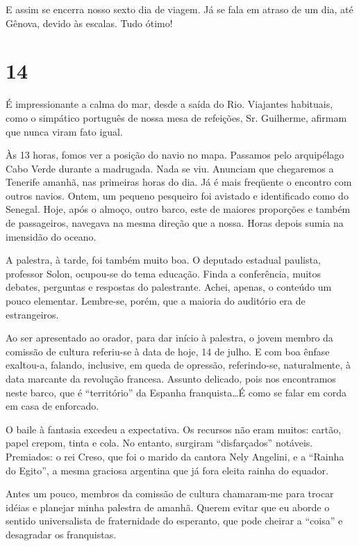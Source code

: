 E assim se encerra nosso sexto dia de viagem. Já se fala em atraso de um dia, até Gênova, devido às escalas. Tudo ótimo!


\section*{14 \adfflatleafright {}}

É impressionante a calma do mar, desde a saída do Rio. Viajantes habituais, como o simpático português de nossa mesa de refeições, Sr. Guilherme, afirmam que nunca viram fato igual.

Às 13 horas, fomos ver a posição do navio no mapa. Passamos pelo arquipélago Cabo Verde durante a madrugada. Nada se viu. Anunciam que chegaremos a Tenerife amanhã, nas primeiras horas do dia. Já é mais freqüente o encontro com outros navios. Ontem, um pequeno pesqueiro foi avistado e identificado como do Senegal. Hoje, após o almoço, outro barco, este de maiores proporções e também de passageiros, navegava na mesma direção que a nossa. Horas depois sumia na imensidão do oceano.

A palestra, à tarde, foi também muito boa. O deputado estadual paulista, professor Solon, ocupou-se do tema educação. Finda a conferência, muitos debates, perguntas e respostas do palestrante. Achei, apenas, o conteúdo um pouco elementar. Lembre-se, porém, que a maioria do auditório era de estrangeiros.

Ao ser apresentado ao orador, para dar início à palestra, o jovem membro da comissão de cultura referiu-se à data de hoje, 14 de julho. E com boa ênfase exaltou-a, falando, inclusive, em queda de opressão, referindo-se, naturalmente, à data marcante da revolução francesa. Assunto delicado, pois nos encontramos neste barco, que é ``território'' da Espanha franquista\ldots É como se falar em corda em casa de enforcado.

O baile à fantasia excedeu a expectativa. Os recursos não eram muitos: cartão, papel crepom, tinta e cola. No entanto, surgiram ``disfarçados'' notáveis. Premiados: o rei Creso, que foi o marido da cantora Nely Angelini, e a ``Rainha do Egito'', a mesma graciosa argentina que já fora eleita rainha do equador.

Antes um pouco, membros da comissão de cultura chamaram-me para trocar idéias e planejar minha palestra de amanhã. Querem evitar que eu aborde o sentido universalista de fraternidade do esperanto, que pode cheirar a ``coisa'' e desagradar os franquistas.


